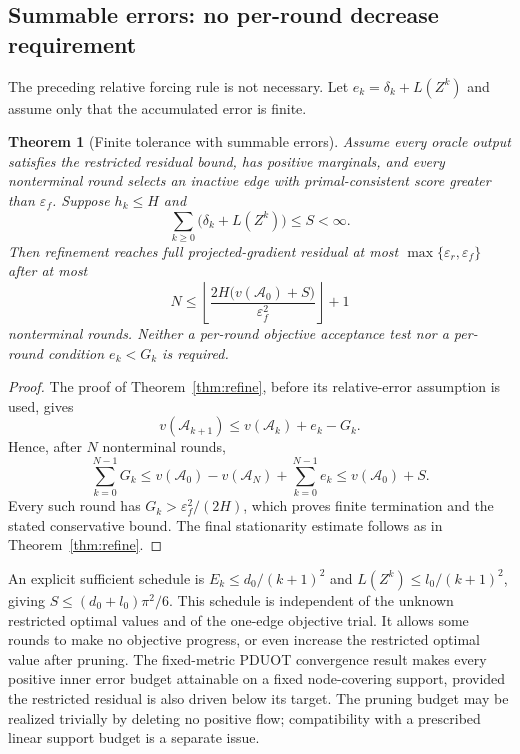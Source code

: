 \documentclass[11pt]{article}
\newtheorem{theorem}{Theorem}
\begin{document}
\subsection{Summable errors: no per-round decrease requirement}
The preceding relative forcing rule is not necessary.
Let $e_k=\delta_k+L(Z^k)$ and assume only that the accumulated error is finite.
\begin{theorem}[Finite tolerance with summable errors]\label{thm:summable}
Assume every oracle output satisfies the restricted residual bound, has positive marginals, and every nonterminal round selects an inactive edge with primal-consistent score greater than $\varepsilon_f$.
Suppose $h_k\leq H$ and
$$\sum_{k\geq0}\big(\delta_k+L(Z^k)\big)\leq S<\infty.$$
Then refinement reaches full projected-gradient residual at most $\max\{\varepsilon_r,\varepsilon_f\}$ after at most
$$N\leq\left\lfloor\frac{2H\big(v(\mathcal A_0)+S\big)}{\varepsilon_f^2}\right\rfloor+1$$
nonterminal rounds.
Neither a per-round objective acceptance test nor a per-round condition $e_k<G_k$ is required.
\end{theorem}
\begin{proof}
The proof of Theorem~\ref{thm:refine}, before its relative-error assumption is used, gives
$$v(\mathcal A_{k+1})\leq v(\mathcal A_k)+e_k-G_k.$$
Hence, after $N$ nonterminal rounds,
$$\sum_{k=0}^{N-1}G_k\leq v(\mathcal A_0)-v(\mathcal A_N)+\sum_{k=0}^{N-1}e_k\leq v(\mathcal A_0)+S.$$
Every such round has $G_k>\varepsilon_f^2/(2H)$, which proves finite termination and the stated conservative bound.
The final stationarity estimate follows as in Theorem~\ref{thm:refine}.
\end{proof}

An explicit sufficient schedule is $E_k\leq d_0/(k+1)^2$ and $L(Z^k)\leq l_0/(k+1)^2$, giving $S\leq(d_0+l_0)\pi^2/6$.
This schedule is independent of the unknown restricted optimal values and of the one-edge objective trial.
It allows some rounds to make no objective progress, or even increase the restricted optimal value after pruning.
The fixed-metric PDUOT convergence result makes every positive inner error budget attainable on a fixed node-covering support, provided the restricted residual is also driven below its target.
The pruning budget may be realized trivially by deleting no positive flow; compatibility with a prescribed linear support budget is a separate issue.
\end{document}

